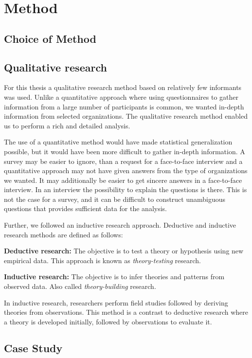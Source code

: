 \chapter{Method}
\section{Choice of Method}


\section{Qualitative research}
\label{sec:qualitativeresearch}
For this thesis a qualitative research method based on relatively few informants was used. Unlike a quantitative approach where using questionnaires to gather information from a large number of participants is common, we wanted in-depth information from selected organizations. The qualitative research method enabled us to perform a rich and detailed analysis. 

The use of a quantitative method would have made statistical generalization possible, but it would have been more difficult to gather in-depth information. A survey may be easier to ignore, than a request for a face-to-face interview and a quantitative approach may not have given answers from the type of organizations we wanted. It may additionally be easier to get sincere answers in a face-to-face interview. In an interview the possibility to explain the questions is there. This is not the case for a survey, and it can be difficult to construct unambiguous questions that provides sufficient data for the analysis.

Further, we followed an inductive research approach. Deductive and inductive research methods are defined as follows\cite{bhattacherjee2012social}: 

\textbf{Deductive research:} The objective is to test a theory or hypothesis using new empirical data. This approach is known as \emph{theory-testing} research.

\textbf{Inductive research:} The objective is to infer theories and patterns from observed data. Also called \emph{theory-building} research.

In inductive research, researchers perform field studies followed by deriving theories from observations. This method is a contrast to deductive research where a theory is developed initially, followed by observations to evaluate it\cite{oates2005researching}.

\section{Case Study}
\label{sec:caseStudy}


